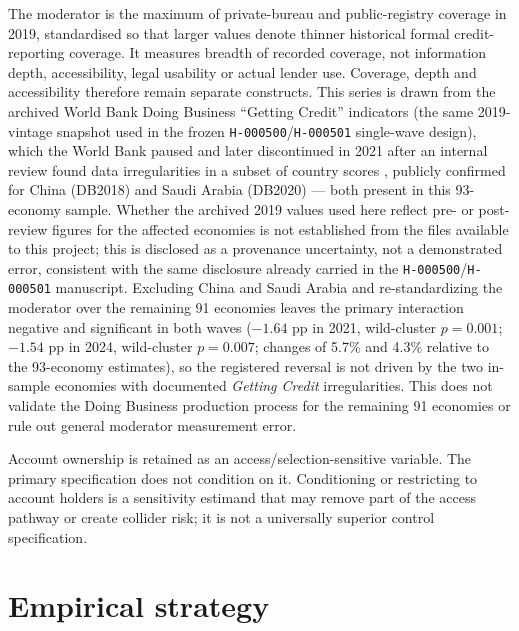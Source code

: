 The moderator is the maximum of private-bureau and public-registry coverage in 2019,
standardised so that larger values denote thinner historical formal credit-reporting
coverage. It measures breadth of recorded coverage, not information depth, accessibility,
legal usability or actual lender use. Coverage, depth and accessibility therefore remain
separate constructs. This series is drawn from the archived World Bank Doing Business
``Getting Credit'' indicators \citep{WorldBankDoingBusinessArchive} (the same 2019-vintage
snapshot used in the frozen \texttt{H-000500}/\texttt{H-000501} single-wave design), which
the World Bank paused and later discontinued in 2021 after an internal review found data
irregularities in a subset of country scores \citep{WorldBank2020Irregularities}, publicly
confirmed for China (DB2018) and Saudi Arabia (DB2020) ---
both present in this 93-economy sample. Whether the archived 2019 values used here reflect
pre- or post-review figures for the affected economies is not established from the files
available to this project; this is disclosed as a provenance uncertainty, not a
demonstrated error, consistent with the same disclosure already carried in the
\texttt{H-000500}/\texttt{H-000501} manuscript. Excluding China and Saudi Arabia and
re-standardizing the moderator over the remaining 91 economies leaves the primary
interaction negative and significant in both waves ($-1.64$ pp in 2021, wild-cluster
$p=0.001$; $-1.54$ pp in 2024, wild-cluster $p=0.007$; changes of 5.7\% and 4.3\%
relative to the 93-economy estimates), so the registered reversal is not driven by the two
in-sample economies with documented \emph{Getting Credit} irregularities. This does not
validate the Doing Business production process for the remaining 91 economies or rule out
general moderator measurement error.

Account ownership is retained as an access/selection-sensitive variable. The primary
specification does not condition on it. Conditioning or restricting to account holders is
a sensitivity estimand that may remove part of the access pathway or create collider risk;
it is not a universally superior control specification.

\section{Empirical strategy}

